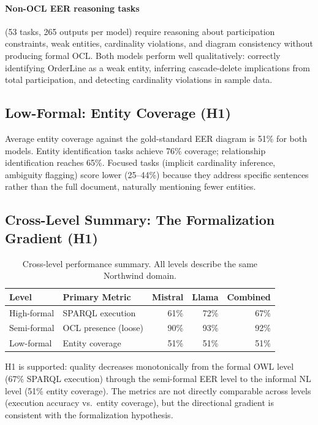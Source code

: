 \documentclass[runningheads]{llncs}
\begin{document}
\paragraph{Non-OCL EER reasoning tasks} (53 tasks, 265 outputs per model) require reasoning about participation constraints, weak entities, cardinality violations, and diagram consistency without producing formal OCL. Both models perform well qualitatively: correctly identifying OrderLine as a weak entity, inferring cascade-delete implications from total participation, and detecting cardinality violations in sample data.

\subsection{Low-Formal: Entity Coverage (H1)}

Average entity coverage against the gold-standard EER diagram is 51\% for both models. Entity identification tasks achieve 76\% coverage; relationship identification reaches 65\%. Focused tasks (implicit cardinality inference, ambiguity flagging) score lower (25--44\%) because they address specific sentences rather than the full document, naturally mentioning fewer entities.

\subsection{Cross-Level Summary: The Formalization Gradient (H1)}

\begin{table}[h]
\centering
\caption{Cross-level performance summary. All levels describe the same Northwind domain.}
\label{tab:summary}
\begin{tabular}{llrrr}
\toprule
Level & Primary Metric & Mistral & Llama & Combined \\
\midrule
High-formal & SPARQL execution & 61\% & 72\% & 67\% \\
Semi-formal & OCL presence (loose) & 90\% & 93\% & 92\% \\
Low-formal & Entity coverage & 51\% & 51\% & 51\% \\
\bottomrule
\end{tabular}
\end{table}

H1 is supported: quality decreases monotonically from the formal OWL level (67\% SPARQL execution) through the semi-formal EER level to the informal NL level (51\% entity coverage). The metrics are not directly comparable across levels (execution accuracy vs.\ entity coverage), but the directional gradient is consistent with the formalization hypothesis.
\end{document}
